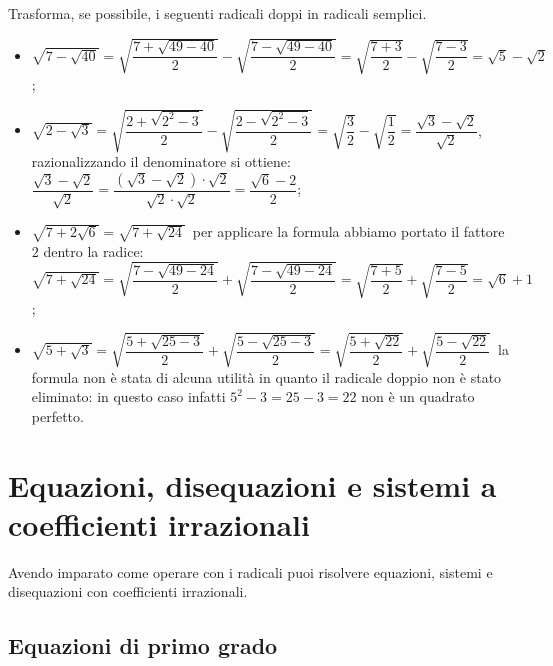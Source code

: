 \begin{exrig}
 \begin{esempio}
Trasforma, se possibile, i seguenti radicali doppi in radicali semplici.
\begin{itemize}
 \item $\sqrt{7-\sqrt{40}}=\sqrt{\dfrac{7+\sqrt{49-40}} 2}-\sqrt{\dfrac{7-\sqrt{49-40}} 2}=\sqrt{\dfrac{7+3} 2}-\sqrt{\dfrac{7-3} 2}=\sqrt 5-\sqrt 2$;
 \item $\sqrt{2-\sqrt 3}=\sqrt{\dfrac{2+\sqrt{2^2-3}} 2}-\sqrt{\dfrac{2-\sqrt{2^2-3}} 2}=\sqrt{\dfrac 3 2}-\sqrt{\dfrac 1 2}=\dfrac{\sqrt 3-\sqrt 2}{\sqrt 2}$, razionalizzando il denominatore si ottiene: $\dfrac{\sqrt 3-\sqrt 2}{\sqrt 2}=\dfrac{(\sqrt 3-\sqrt 2)\cdot \sqrt 2}{\sqrt 2\cdot \sqrt 2}=\dfrac{\sqrt 6-2} 2$;
 \item $\sqrt{7+2\sqrt 6}=\sqrt{7+\sqrt{24}}$\, per applicare la formula abbiamo portato il fattore $2$ dentro la radice: $\sqrt{7+\sqrt{24}}=\sqrt{\dfrac{7-\sqrt{49-24}} 2}+\sqrt{\dfrac{7-\sqrt{49-24}} 2}=\sqrt{\dfrac{7+5} 2}+\sqrt{\dfrac{7-5} 2}=\sqrt 6+1$;
 \item $\sqrt{5+\sqrt 3}=\sqrt{\dfrac{5+\sqrt{25-3}} 2}+\sqrt{\dfrac{5-\sqrt{25-3}} 2}=\sqrt{\dfrac{5+\sqrt{22}} 2}+\sqrt{\dfrac{5-\sqrt{22}} 2}$\, la formula non è stata di alcuna utilità in quanto il radicale doppio non è stato eliminato: in questo caso infatti $5^2-3 = 25-3=22$ non è un quadrato perfetto.
\end{itemize}
 \end{esempio}
\end{exrig}
\vspazio\ovalbox{\risolvii \ref{ese:2.95}, \ref{ese:2.96}, \ref{ese:2.97}, \ref{ese:2.98}}

\section{Equazioni, disequazioni e sistemi a coefficienti irrazionali}

Avendo imparato come operare con i radicali puoi risolvere equazioni, sistemi e disequazioni con coefficienti irrazionali.

\subsection{Equazioni di primo grado}

